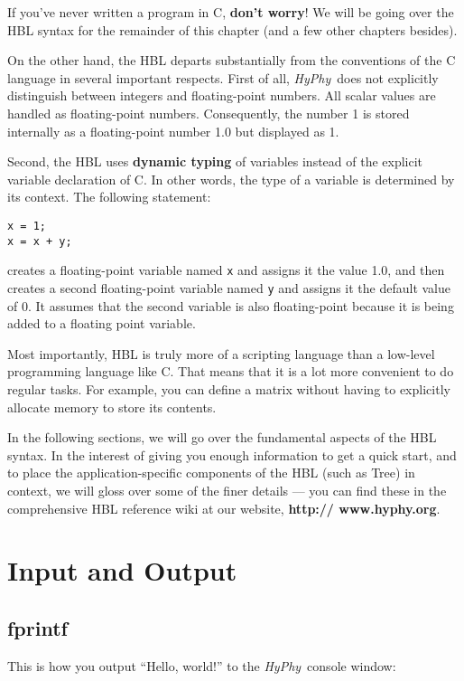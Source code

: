 \documentclass[12pt]{book}
\newcommand{\hyphy}{\textit{HyPhy}}
\begin{document}
If you've never written a program in C, \textbf{don't worry}!  We will be going over the HBL syntax for the remainder of this chapter (and a few other chapters besides).

On the other hand, the HBL departs substantially from the conventions of the C language in several important respects.  First of all, \hyphy\ does not explicitly distinguish between integers and floating-point numbers.  All scalar values are handled as floating-point numbers.  Consequently, the number 1 is stored internally as a floating-point number 1.0 but displayed as 1.  

Second, the HBL uses {\bf dynamic typing} of variables instead of the explicit variable declaration of C.  In other words, the type of a variable is determined by its context.  The following statement:


\begin{leftbar}
\begin{verbatim}
x = 1;
x = x + y;
\end{verbatim}
\end{leftbar}

\noindent creates a floating-point variable named {\tt x} and assigns it the value 1.0, and then creates a second floating-point variable named {\tt y} and assigns it the default value of 0.  It assumes that the second variable is also floating-point because it is being added to a floating point variable.  

Most importantly, HBL is truly more of a scripting language than a low-level programming language like C.  That means that it is a lot more convenient to do regular tasks.  For example, you can define a matrix without having to explicitly allocate memory to store its contents.

In the following sections, we will go over the fundamental aspects of the HBL syntax.  In the interest of giving you enough information to get a quick start, and to place the application-specific components of the HBL (such as Tree) in context, we will gloss over some of the finer details --- you can find these in the comprehensive HBL reference wiki at our website, \textbf{http:// www.hyphy.org}.  


\section {Input and Output}\label{io}

\subsection {fprintf}
This is how you output ``Hello, world!'' to the \hyphy\ console window:
\end{document}
